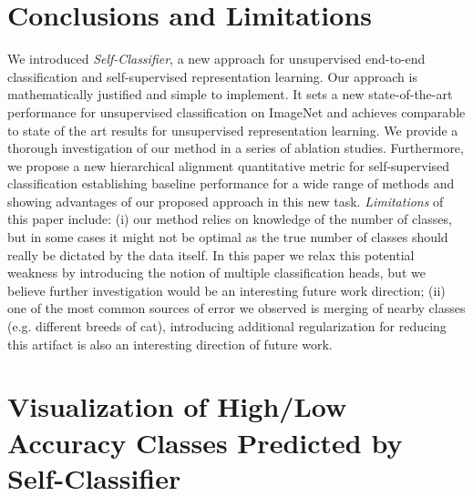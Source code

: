\documentclass[runningheads]{llncs}
\begin{document}
\section{Conclusions and Limitations}
We introduced \textit{Self-Classifier}, a new approach for unsupervised end-to-end classification and self-supervised representation learning. Our approach is mathematically justified and simple to implement. It sets a new state-of-the-art performance for unsupervised classification on ImageNet and achieves comparable to state of the art results for unsupervised representation learning. We provide a thorough investigation of our method in a series of ablation studies. Furthermore, we propose a new hierarchical alignment quantitative metric for self-supervised classification establishing baseline performance for a wide range of methods and showing advantages of our proposed approach in this new task.
\textit{Limitations} of this paper include: (i) our method relies on knowledge of the number of classes, but in some cases it might not be optimal as the true number of classes should really be dictated by the data itself. In this paper we relax this potential weakness by introducing the notion of multiple classification heads, but we believe further investigation would be an interesting future work direction; (ii) one of the most common sources of error we observed is merging of nearby classes (e.g. different breeds of cat), introducing additional regularization for reducing this artifact is also an interesting direction of future work.




\clearpage
\section{Visualization of High/Low Accuracy Classes Predicted by Self-Classifier}
\label{section:low_high_acc_visualization}
\end{document}
